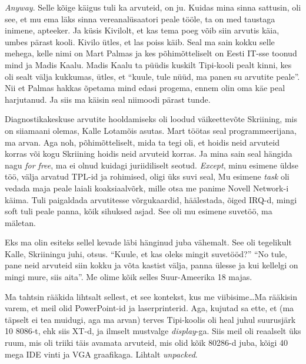 \emph{Anyway}. Selle kõige käigus tuli ka arvuteid, on ju. Kuidas mina sinna sattusin, oli see, et mu ema läks sinna vereanalüsaatori peale tööle, ta on med taustaga inimene, apteeker. Ja küsis Kivilolt, et kas tema poeg võib siin arvutis käia, umbes pärast kooli. Kivilo ütles, et las poiss käib. Seal ma sain kokku selle mehega, kelle nimi on Mart Palmas ja kes põhimõtteliselt on Eesti IT-sse toonud  mind ja Madis Kaalu. Madis Kaalu ta püüdis kuskilt Tipi-kooli pealt kinni, kes oli sealt välja kukkumas, ütles, et \enquote{kuule, tule nüüd, ma panen su arvutite peale}. Nii et Palmas hakkas õpetama mind  edasi progema, ennem olin oma käe peal harjutanud. Ja siis ma käisin seal niimoodi pärast tunde. 


Diagnostikakeskuse arvutite hooldamiseks oli loodud väikeettevõte Skriining, mis on siiamaani olemas, Kalle Lotamõis asutas. Mart töötas seal programmeerijana, ma arvan. Aga noh, põhimõtteliselt, mida ta tegi oli, et hoidis neid arvuteid korras või kogu Skriining hoidis neid arvuteid korras. Ja mina sain seal hängida nagu \emph{for free}, ma ei olnud kuidagi juriidiliselt seotud. \emph{Except}, minu esimene üldse töö, välja arvatud TPL-id ja rohimised, oligi üks suvi seal, Mu esimene \emph{task} oli vedada maja peale laiali koaksiaalvõrk, mille otsa me panime Novell Network-i käima. Tuli paigaldada  arvutitesse võrgukaardid, häälestada, õiged IRQ-d, mingi soft tuli peale panna, kõik sihuksed asjad. See oli mu esimene suvetöö, ma mäletan.


Eks ma olin esiteks sellel kevade läbi hänginud juba vähemalt. See oli tegelikult Kalle, Skriiningu juhi, otsus. \enquote{Kuule, et kas oleks mingit suvetööd?} \enquote{No tule, pane neid arvuteid siin kokku ja võta kastist välja, panna ülesse ja kui kellelgi on mingi mure, siis aita}. Me olime kõik selles Suur-Ameerika 18 majas. 

Ma tahtsin rääkida lihtsalt sellest, et see kontekst, kus me viibisime\ldots Ma rääkisin varem, et meil olid PowerPoint-id ja  laserprinterid. Aga, kujutad sa ette, et (ma täpselt ei tea muidugi, aga ma arvan) terves Tipi-koolis oli heal juhul suurusjärk 10 8086-t, ehk siis XT-d, ja ilmselt mustvalge \emph{display}-ga. Siis meil oli reaalselt üks ruum, mis oli triiki täis avamata arvuteid, mis olid kõik 80286-d juba, kõigi 40 mega IDE vinti ja VGA graafikaga. Lihtalt \emph{unpacked}. 

